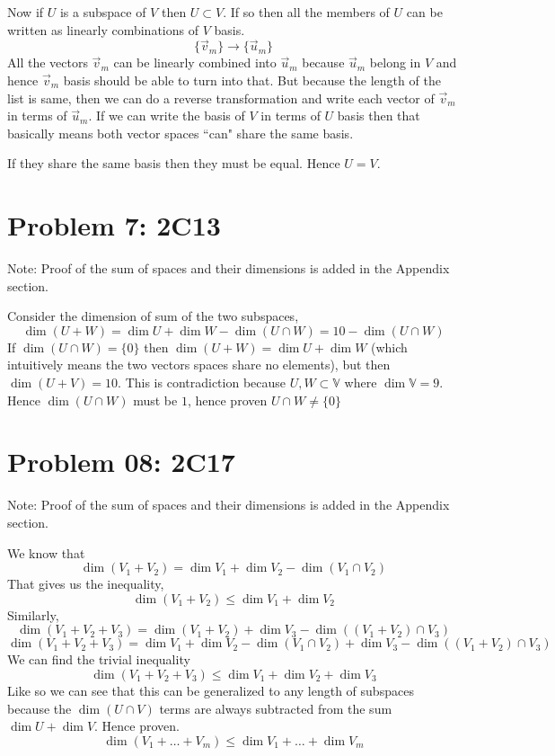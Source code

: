 \documentclass[letter]{article}
\begin{document}
Now if $U$ is a subspace of $V$ then $U \subset V$. If so then all the members of $U$ can be written as linearly combinations of $V$ basis. 
\[
	\{\vec{v}_m\}  \to \{\vec{u}_m\} 
\]
All the vectors $\vec{v}_m$ can be linearly combined into $ \vec{u}_m$ because $\vec{u}_m$ belong in $V$ and hence $\vec{v}_m$ basis should be able to turn into that. But because the length of the list is same, then we can do a reverse transformation and write each vector of $\vec{v}_m$ in terms of $\vec{u}_m$. If we can write the basis of $V$ in terms of $U$ basis then that basically means both vector spaces ``can" share the same basis. 

If they share the same basis then they must be equal. Hence $U = V$.

\section*{Problem 7: 2C13}
Note: 
Proof of the sum of spaces and their dimensions is added in the Appendix section. 

Consider the dimension of sum of the two subspaces,
\[
\dim(U + W) = \dim U + \dim W - \dim (U \cap  W) = 10 - \dim(U \cap W)
\]
If $\dim (U \cap W) = \{0\} $ then $\dim (U + W) = \dim U + \dim W$ (which intuitively means the two vectors spaces share no elements), but then $\dim (U + V) = 10$. This is contradiction because $U,W \subset \mathbb{V}$ where $\dim \mathbb{V} = 9$. Hence $\dim(U\cap W)$ must be $1$, hence proven $U \cap W \neq \{0\} $

\section*{Problem 08: 2C17}
Note: 
Proof of the sum of spaces and their dimensions is added in the Appendix section. 

We know that 
\[
\dim(V_1 + V_2) = \dim V_1 + \dim V_2 - \dim(V_1 \cap  V_2)
\] That gives us the inequality, 
\[
\dim(V_1 + V_2) \le   \dim V_1 + \dim V_2
\] Similarly, 
\[
\dim(V_1 + V_2 + V_3) = \dim (V_1 +  V_2) + \dim V_3 - \dim((V_1 +  V_2) \cap V_3) 
\] 
\[ \dim(V_1 + V_2 + V_3) = \dim V_1 + \dim V_2 - \dim(V_1 \cap  V_2) + 
\dim V_3 - \dim((V_1 +  V_2) \cap V_3) 
\]
We can find the trivial inequality 
\[
\dim(V_1 + V_2 + V_3) \le \dim V_1 + \dim V_2 + \dim V_3
\]
Like so we can see that this can be generalized to any length of subspaces because the $ \dim (U \cap V)$ terms are always subtracted from the sum $\dim U + \dim V$. Hence proven. 
\[
\dim (V_1+\ldots+V_m) \le \dim V_1 + \ldots + \dim V_m
\] 
\end{document}
